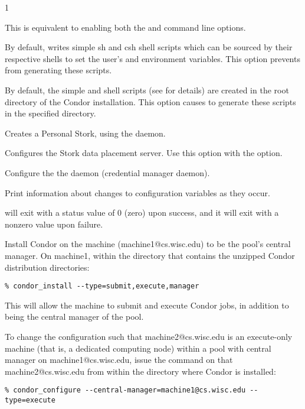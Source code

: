 \begin{ManPage}{\label{man-condor-configure}}{1}
\begin{Options}
   {
    This is equivalent to enabling both the  and
     command line options.  }

   {
    By default,  writes simple sh and csh
    shell scripts which can be sourced by their respective
    shells to set the user's  and 
    environment
    variables.  This option prevents  from
    generating these scripts.  }

   {
    By default, the simple  and  shell scripts (see
     for details) are created in 
    the root directory of the Condor installation.  This option
    causes  to generate these scripts in the
    specified directory.  }

   {Creates a 
    Personal Stork, using the  daemon.}

   {Configures the 
    Stork data placement server.
    Use this option with the  option.}

   {Configure the
    the  daemon (credential manager daemon).}

   {Print information about changes
    to configuration variables as they occur.}
\end{Options}

\ExitStatus

 will exit with a status value of 0 (zero) upon success,
and it will exit with a nonzero value upon failure.

\Examples
Install Condor on the machine (machine1@cs.wisc.edu)
to be the pool's central manager.
On machine1,
within the directory that contains the unzipped Condor
distribution directories:
\footnotesize
\begin{verbatim}
% condor_install --type=submit,execute,manager
\end{verbatim}
\normalsize
This will allow the machine to submit and execute Condor jobs, 
in addition to being the central manager of the pool.


To change the configuration such that
machine2@cs.wisc.edu is an execute-only machine
(that is, a dedicated computing node)
within a pool with central manager on machine1@cs.wisc.edu,
issue the command on that machine2@cs.wisc.edu
from within the directory where Condor is installed:
\footnotesize
\begin{verbatim}
% condor_configure --central-manager=machine1@cs.wisc.edu --type=execute
\end{verbatim}
\normalsize




\end{ManPage}
